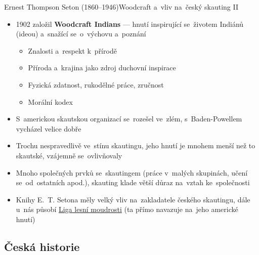 \documentclass[compress, ucs, xelatex, 11pt, xcolor=dvipsnames, print, aspectratio=169,
	hyperref={
		bookmarks=true,
		unicode=true,
		colorlinks=true,
		pdftitle={Skautska vychovna metoda},
		plainpages=false,
		pdfauthor={Vojtech Zeisek},
		pdfsubject={Skautska vychovna metoda a jeji vyvoj za posledni stoleti a desetileti},
		pdfcreator={XeLaTeX},
		pdfkeywords={Junak, Pedagogika, Skaut, Skauting, Vychovna metoda},
		linkcolor=Red, %
		anchorcolor=ForestGreen, %
		citecolor=ForestGreen, %
		filecolor=ForestGreen, %
		menucolor=ForestGreen, %
		urlcolor=Sepia, %
		pdftex},
	url={hyphens, lowtilde} %
	]{beamer}
\begin{document}
\begin{frame}{Ernest Thompson Seton (1860--1946)}{Woodcraft a~vliv na~český skauting II}
	\begin{itemize}
		\item 1902 založil \textbf{Woodcraft Indians} --- hnutí inspirující se~životem Indiánů (ideou) a~snažící se~o~výchovu a~poznání
		\begin{itemize}
			\item Znalosti a~respekt k~přírodě
			\item Příroda a~krajina jako zdroj duchovní inspirace
			\item Fyzická zdatnost, rukodělné práce, zručnost
			\item Morální kodex
		\end{itemize}
		\item S~americkou skautskou organizací se~rozešel ve~zlém, s~Baden-Powellem vycházel velice dobře
		\item Trochu nespravedlivě ve~stínu skautingu, jeho hnutí je mnohem menší než to skautské, vzájemně se~ovlivňovaly
		\item Mnoho společných prvků se~skautingem (práce v~malých skupinách, učení se~od~ostatních apod.), skauting klade větší důraz na~vztah ke~společnosti
		\item Knihy E.~T. Setona měly velký vliv na~zakladatele českého skautingu, dále u~nás působí \href{https://www.woodcraft.cz/}{Liga lesní moudrosti} (ta přímo navazuje na~jeho americké hnutí)
	\end{itemize}
\end{frame}

\subsection{Česká historie}
\end{document}
